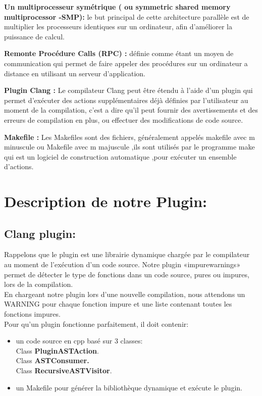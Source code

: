\documentclass[12pt,a4paper]{article}
\begin{document}
\textbf{ Un multiprocesseur symétrique ( ou symmetric shared memory multiprocessor -SMP): } 
le but principal de cette architecture parallèle  est de multiplier les processeurs identiques sur un ordinateur, afin d’améliorer  la puissance de calcul.\cite{wiki}

\textbf{ Remonte Procédure Calls (RPC) : } définie comme étant un moyen de communication qui permet de faire appeler des procédures sur un ordinateur a distance en utilisant un serveur d'application.\cite{wiki}

\textbf{Plugin Clang :} Le compilateur Clang peut être étendu à l'aide d'un plugin qui permet d'exécuter des actions supplémentaires déjà définies par l'utilisateur au moment de la compilation\cite{ClangTeam}, c'est a dire qu'il peut fournir des avertissements et des erreurs de compilation en plus, ou effectuer des modifications de code source.\cite{clang}

\textbf{Makefile :} Les Makefiles sont des fichiers, généralement appelés makefile avec m minuscule ou Makefile avec m majuscule ,ils sont utilisés par le programme make qui est un logiciel de construction automatique ,pour exécuter un ensemble d'actions.\cite{makefile}
\section{Description de notre Plugin:}

\subsection{Clang plugin:}

Rappelons que le plugin est une librairie dynamique chargée par le compilateur au moment de l’exécution d’un code source.
Notre plugin «impurewarnings»  permet de détecter le type de fonctions dans un code source, pures ou impures, lors de la compilation. \\
En chargeant notre plugin lors d’une nouvelle compilation, nous attendons un WARNING pour chaque fonction impure  et une liste contenant toutes les fonctions impures.\\

Pour qu'un plugin fonctionne parfaitement, il doit contenir: 
\begin{itemize}
    \item un code source en cpp basé sur 3 classes:\\
	 Class \textbf{PluginASTAction}.\\
	 Class  \textbf{ASTConsumer.}\\
	 Class \textbf{RecursiveASTVisitor}.
\item un Makefile  pour générer la bibliothèque dynamique et exécute le plugin.
\end{itemize}
\end{document}
